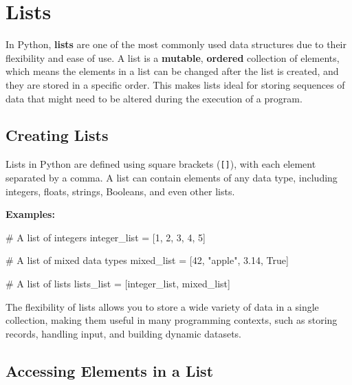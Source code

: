 \documentclass[
  letterpaper,
  DIV=11,
  numbers=noendperiod]{scrreprt}
\newenvironment{Shaded}{\begin{snugshade}}{\end{snugshade}}
\newcommand{\CommentTok}[1]{\textcolor[rgb]{0.37,0.37,0.37}{#1}}
\newcommand{\DecValTok}[1]{\textcolor[rgb]{0.68,0.00,0.00}{#1}}
\newcommand{\FloatTok}[1]{\textcolor[rgb]{0.68,0.00,0.00}{#1}}
\newcommand{\NormalTok}[1]{\textcolor[rgb]{0.00,0.23,0.31}{#1}}
\newcommand{\OperatorTok}[1]{\textcolor[rgb]{0.37,0.37,0.37}{#1}}
\newcommand{\StringTok}[1]{\textcolor[rgb]{0.13,0.47,0.30}{#1}}
\newcommand{\VariableTok}[1]{\textcolor[rgb]{0.07,0.07,0.07}{#1}}
\begin{document}
\hypertarget{lists}{%
\section{Lists}\label{lists}}

In Python, \textbf{lists} are one of the most commonly used data
structures due to their flexibility and ease of use. A list is a
\textbf{mutable}, \textbf{ordered} collection of elements, which means
the elements in a list can be changed after the list is created, and
they are stored in a specific order. This makes lists ideal for storing
sequences of data that might need to be altered during the execution of
a program.

\hypertarget{creating-lists}{%
\subsection{Creating Lists}\label{creating-lists}}

Lists in Python are defined using square brackets (\texttt{{[}{]}}),
with each element separated by a comma. A list can contain elements of
any data type, including integers, floats, strings, Booleans, and even
other lists.

\textbf{Examples:}

\begin{Shaded}
\begin{Highlighting}[]
\CommentTok{\# A list of integers}
\NormalTok{integer\_list }\OperatorTok{=}\NormalTok{ [}\DecValTok{1}\NormalTok{, }\DecValTok{2}\NormalTok{, }\DecValTok{3}\NormalTok{, }\DecValTok{4}\NormalTok{, }\DecValTok{5}\NormalTok{]}

\CommentTok{\# A list of mixed data types}
\NormalTok{mixed\_list }\OperatorTok{=}\NormalTok{ [}\DecValTok{42}\NormalTok{, }\StringTok{"apple"}\NormalTok{, }\FloatTok{3.14}\NormalTok{, }\VariableTok{True}\NormalTok{]}

\CommentTok{\# A list of lists}
\NormalTok{lists\_list }\OperatorTok{=}\NormalTok{ [integer\_list, mixed\_list]}
\end{Highlighting}
\end{Shaded}

The flexibility of lists allows you to store a wide variety of data in a
single collection, making them useful in many programming contexts, such
as storing records, handling input, and building dynamic datasets.

\hypertarget{accessing-elements-in-a-list}{%
\subsection{Accessing Elements in a
List}\label{accessing-elements-in-a-list}}
\end{document}
